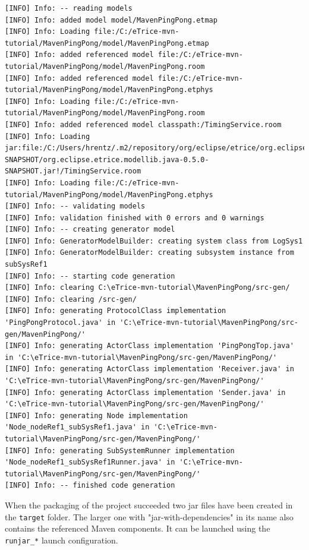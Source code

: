\begin{lstlisting}[language=PlainText]
[INFO] Info: -- reading models
[INFO] Info: added model model/MavenPingPong.etmap
[INFO] Info: Loading file:/C:/eTrice-mvn-tutorial/MavenPingPong/model/MavenPingPong.etmap
[INFO] Info: added referenced model file:/C:/eTrice-mvn-tutorial/MavenPingPong/model/MavenPingPong.room
[INFO] Info: added referenced model file:/C:/eTrice-mvn-tutorial/MavenPingPong/model/MavenPingPong.etphys
[INFO] Info: Loading file:/C:/eTrice-mvn-tutorial/MavenPingPong/model/MavenPingPong.room
[INFO] Info: added referenced model classpath:/TimingService.room
[INFO] Info: Loading jar:file:/C:/Users/hrentz/.m2/repository/org/eclipse/etrice/org.eclipse.etrice.modellib.java/0.5.0-SNAPSHOT/org.eclipse.etrice.modellib.java-0.5.0-SNAPSHOT.jar!/TimingService.room
[INFO] Info: Loading file:/C:/eTrice-mvn-tutorial/MavenPingPong/model/MavenPingPong.etphys
[INFO] Info: -- validating models
[INFO] Info: validation finished with 0 errors and 0 warnings
[INFO] Info: -- creating generator model
[INFO] Info: GeneratorModelBuilder: creating system class from LogSys1
[INFO] Info: GeneratorModelBuilder: creating subsystem instance from subSysRef1
[INFO] Info: -- starting code generation
[INFO] Info: clearing C:\eTrice-mvn-tutorial\MavenPingPong/src-gen/
[INFO] Info: clearing /src-gen/
[INFO] Info: generating ProtocolClass implementation 'PingPongProtocol.java' in 'C:\eTrice-mvn-tutorial\MavenPingPong/src-gen/MavenPingPong/'
[INFO] Info: generating ActorClass implementation 'PingPongTop.java' in 'C:\eTrice-mvn-tutorial\MavenPingPong/src-gen/MavenPingPong/'
[INFO] Info: generating ActorClass implementation 'Receiver.java' in 'C:\eTrice-mvn-tutorial\MavenPingPong/src-gen/MavenPingPong/'
[INFO] Info: generating ActorClass implementation 'Sender.java' in 'C:\eTrice-mvn-tutorial\MavenPingPong/src-gen/MavenPingPong/'
[INFO] Info: generating Node implementation 'Node_nodeRef1_subSysRef1.java' in 'C:\eTrice-mvn-tutorial\MavenPingPong/src-gen/MavenPingPong/'
[INFO] Info: generating SubSystemRunner implementation 'Node_nodeRef1_subSysRef1Runner.java' in 'C:\eTrice-mvn-tutorial\MavenPingPong/src-gen/MavenPingPong/'
[INFO] Info: -- finished code generation
\end{lstlisting}

When the packaging of the project succeeded two jar files have been created in the \texttt{target} folder.
The larger one with "jar-with-dependencies" in its name also contains the referenced Maven components. It can be
launched using the \texttt{runjar\_*} launch configuration.

